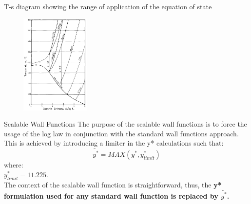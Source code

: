 \begin{frame}{T-s diagram showing the range of application of the equation of state\cite{young1988equation}}
    \begin{figure}
        \centering
        \includegraphics[height=5cm]{images/tsdiagramrangeofapplicationeos.jpg}
    \end{figure}
\end{frame}

\begin{frame}{Scalable Wall Functions\cite{ansys2017ansys}}
    The purpose of the scalable wall functions is to force the usage of the log law in conjunction with the standard wall functions approach. This is achieved by introducing a limiter in the y* calculations such that:
    \begin{equation}
        \tilde{y^*} = MAX(y^*, y_{limit}^*)
    \end{equation}
    where:\\
        $y_{limit}^* = 11.225.$\\
    The context of the scalable wall function is straightforward, thus, the \textbf{y* formulation used for any standard wall function is replaced by $\tilde{y^*}$.}
\end{frame}

